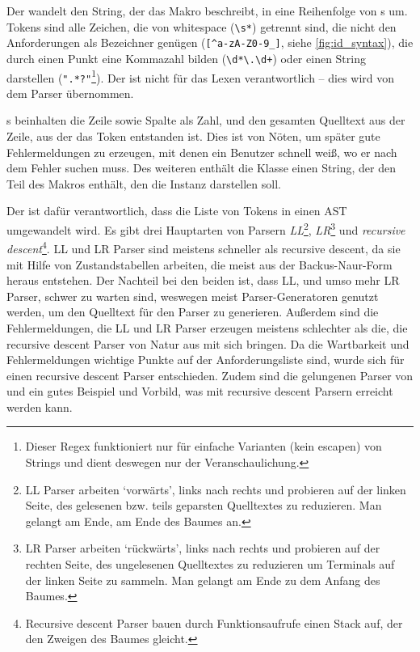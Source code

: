       Der  wandelt den String, der das Makro beschreibt, in eine Reihenfolge von s um. Tokens sind alle Zeichen, die von whitespace (\lstinline[language=MyRegex]$\s*$) getrennt sind, die nicht den Anforderungen als Bezeichner genügen (\lstinline[language=MyRegex]$[^a-zA-Z0-9_]$, siehe \autoref{fig:id_syntax}), die durch einen Punkt eine
      Kommazahl bilden (\lstinline[language=MyRegex]$\d*\.\d+$) oder einen String darstellen (\lstinline[language=MyRegex]$".*?"$\footnote{
        Dieser Regex funktioniert nur für einfache Varianten (kein escapen) von Strings und dient deswegen nur der Veranschaulichung.
      }). Der  ist nicht für das Lexen verantwortlich -- dies wird von dem Parser übernommen.

      s beinhalten die Zeile sowie Spalte als Zahl, und den gesamten Quelltext aus der Zeile, aus der das Token entstanden ist. Dies ist von Nöten, um später gute Fehlermeldungen zu erzeugen, mit denen ein Benutzer schnell weiß, wo er nach dem Fehler suchen muss. Des weiteren enthält die Klasse einen String, der den Teil des Makros enthält, den die Instanz darstellen soll.

      Der  ist dafür verantwortlich, dass die Liste von Tokens in einen AST umgewandelt wird. Es gibt drei Hauptarten von Parsern\autocite[S.77\,f.]{eirund2013formale} \emph{LL}\footnote{
        LL Parser arbeiten `vorwärts', links nach rechts und probieren auf der linken Seite, des gelesenen bzw. teils geparsten Quelltextes zu reduzieren. Man gelangt am Ende, am Ende des Baumes an.
      }, \emph{LR}\footnote{
        LR Parser arbeiten `rückwärts', links nach rechts und probieren auf der rechten Seite, des ungelesenen Quelltextes zu reduzieren um Terminals auf der linken Seite zu sammeln. Man gelangt am Ende zu dem Anfang des Baumes.\autocite{cs143-stanford}
      } und \emph{recursive descent}\footnote{
        Recursive descent Parser bauen durch Funktionsaufrufe einen Stack auf, der den Zweigen des Baumes gleicht.
      }.
      LL und LR Parser sind meistens schneller als recursive descent, da sie mit Hilfe von Zustandstabellen arbeiten, die meist aus der Backus-Naur-Form heraus entstehen. Der Nachteil bei den beiden ist, dass LL, und umso mehr LR Parser, schwer zu warten sind, weswegen meist Parser-Generatoren genutzt werden, um den Quelltext für den Parser zu generieren. Außerdem sind die Fehlermeldungen, die LL und LR Parser erzeugen meistens schlechter als die, die recursive descent Parser von Natur aus mit sich bringen\autocite{scott2010gll}. Da die Wartbarkeit und Fehlermeldungen wichtige Punkte auf der Anforderungsliste sind, wurde sich für einen recursive descent Parser entschieden. Zudem sind die gelungenen Parser von  und  ein gutes Beispiel und Vorbild, was mit recursive descent Parsern erreicht werden kann.

